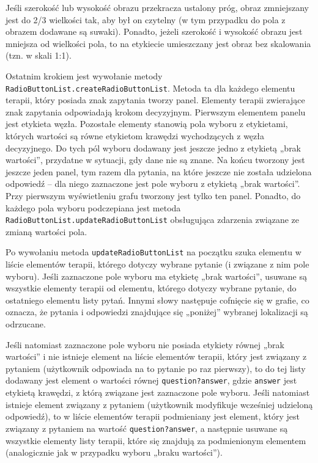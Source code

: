 Jeśli szerokość lub wysokość obrazu przekracza ustalony próg, obraz zmniejszany jest do 2/3 wielkości tak, aby był on czytelny (w tym przypadku do pola z obrazem dodawane są suwaki). Ponadto, jeżeli szerokość i wysokość obrazu jest mniejsza od wielkości pola, to na etykiecie umieszczany jest obraz bez skalowania (tzn. w skali 1:1).
 
Ostatnim krokiem jest wywołanie metody \texttt{RadioButtonList.createRadioButtonList}. Metoda ta dla każdego elementu terapii, który posiada znak zapytania tworzy panel. Elementy terapii zwierające znak zapytania odpowiadają krokom decyzyjnym. Pierwszym elementem panelu jest etykieta węzła. Pozostałe elementy stanowią pola wyboru z etykietami, których wartości są równe etykietom krawędzi wychodzących z węzła decyzyjnego. Do tych pól wyboru dodawany jest jeszcze jedno z etykietą „brak wartości”, przydatne w sytuacji, gdy dane nie są znane. Na końcu tworzony jest jeszcze jeden panel, tym razem dla pytania, na które jeszcze nie została udzielona odpowiedź -- dla niego zaznaczone jest pole wyboru z etykietą „brak wartości”. Przy pierwszym wyświetleniu grafu tworzony jest tylko ten panel. Ponadto, do każdego pola wyboru podczepiana jest metoda \texttt{RadioButtonList.updateRadioButtonList} obsługująca zdarzenia związane ze zmianą wartości pola.

Po wywołaniu metoda \texttt{updateRadioButtonList} na początku szuka elementu w liście elementów terapii, którego dotyczy wybrane pytanie (i związane z nim pole wyboru). Jeśli zaznaczone pole wyboru ma etykietę „brak wartości”, usuwane są wszystkie elementy terapii od elementu, którego dotyczy wybrane pytanie, do ostatniego elementu listy pytań. Innymi słowy następuje cofnięcie się w grafie, co oznacza, że pytania i odpowiedzi znajdujące się „poniżej” wybranej lokalizacji są odrzucane.

Jeśli natomiast zaznaczone pole wyboru nie posiada etykiety równej „brak wartości” i nie istnieje element na liście elementów terapii, który jest związany z pytaniem (użytkownik odpowiada na to pytanie po raz pierwszy), to do tej listy dodawany jest element o wartości równej \texttt{question?answer}, gdzie \texttt{answer} jest etykietą krawędzi, z którą związane jest zaznaczone pole wyboru.  Jeśli natomiast istnieje element związany z pytaniem (użytkownik modyfikuje wcześniej udzieloną odpowiedź), to w liście elementów terapii podmieniany jest element, który jest związany z pytaniem na wartość \texttt{question?answer}, a następnie usuwane są wszystkie elementy listy terapii, które się znajdują za podmienionym elementem (analogicznie jak w przypadku wyboru „braku wartości”). 

